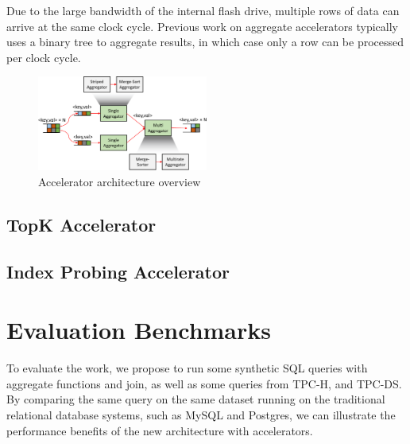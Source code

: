 \documentclass{article}
\begin{document}
Due to the large bandwidth of the internal flash drive, multiple rows of data can arrive at the same clock cycle.
Previous work on aggregate accelerators typically uses a binary tree to aggregate results, in which case only a row can be processed per clock cycle.


\begin{figure}[t]
    \centering
    \includegraphics[page=1, width=0.50\textwidth]{figures/figures-crop.pdf}
    \caption{Accelerator architecture overview}
    \label{fig:arch-overview}
	\vspace{-10pt}
\end{figure}


\subsection{TopK Accelerator}

\subsection{Index Probing Accelerator}



\section{Evaluation Benchmarks}
\label{sec:eval}
To evaluate the work, we propose to run some synthetic SQL queries with aggregate functions and join, as well as some queries from TPC-H, and TPC-DS.
By comparing the same query on the same dataset running on the traditional relational database systems, such as MySQL and Postgres, we can illustrate the performance benefits of the new architecture with accelerators.
\end{document}
